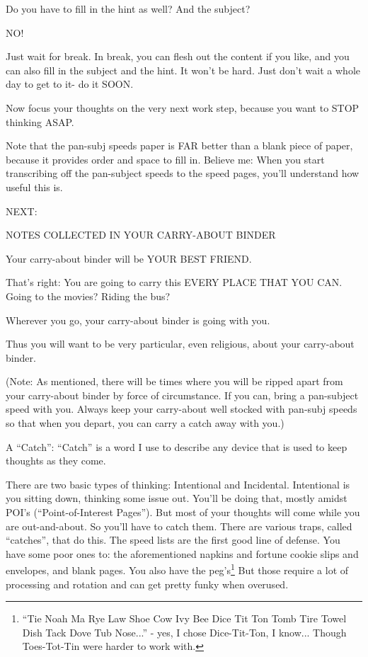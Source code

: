 \documentclass[oneside]{book}
\begin{document}
Do you have to fill in the hint as well? And the subject?

NO!

Just wait for break. In break, you can flesh out the content if you
like, and you can also fill in the subject and the hint. It won't be
hard. Just don't wait a whole day to get to it- do it SOON.

Now focus your thoughts on the very next work step, because you want
to STOP thinking ASAP.

Note that the pan-subj speeds paper is FAR better than a blank piece
of paper, because it provides order and space to fill in. Believe me:
When you start transcribing off the pan-subject speeds to the speed
pages, you'll understand how useful this is.

NEXT:

NOTES COLLECTED IN YOUR CARRY-ABOUT BINDER

Your carry-about binder will be YOUR BEST FRIEND.

That's right: You are going to carry this EVERY PLACE THAT YOU
CAN. Going to the movies? Riding the bus?

Wherever you go, your carry-about binder is going with you.

Thus you will want to be very particular, even religious, about your
carry-about binder.

(Note: As mentioned, there will be times where you will be ripped
apart from your carry-about binder by force of circumstance. If you
can, bring a pan-subject speed with you. Always keep your carry-about
well stocked with pan-subj speeds so that when you depart, you can
carry a catch away with you.)

A ``Catch'': ``Catch'' is a word I use to describe any device that is used
to keep thoughts as they come.

There are two basic types of thinking: Intentional and
Incidental. Intentional is you sitting down, thinking some issue
out. You'll be doing that, mostly amidst POI's (``Point-of-Interest
Pages''). But most of your thoughts will come while you are
out-and-about. So you'll have to catch them. There are various traps,
called ``catches'', that do this. The speed lists are the first good
line of defense. You have some poor ones to: the aforementioned
napkins and fortune cookie slips and envelopes, and blank pages. You
also have the peg's\footnote{``Tie Noah Ma Rye Law Shoe Cow Ivy Bee Dice Tit
Ton Tomb Tire Towel Dish Tack Dove Tub Nose...'' - yes, I chose
Dice-Tit-Ton, I know... Though Toes-Tot-Tin were harder to work with.}
But those require a lot of processing and rotation and can get pretty
funky when overused.
\end{document}
